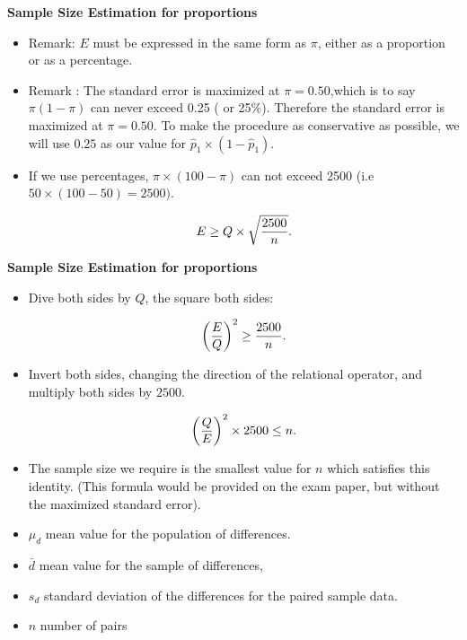 
\newpage






\textbf{Sample Size Estimation for proportions}
\begin{itemize}
\item Remark: $E$ must be expressed in the same form as $\pi$, either as a proportion or as a percentage.
\item Remark : The standard error is maximized at $\pi = 0.50$,which is to say $\pi(1-\pi)$ can never exceed 0.25 ( or 25\%). Therefore the standard error is maximized at $\pi = 0.50$. To make the procedure as conservative as possible, we will use $0.25$ as our value for $\hat{p}_1 \times (1 - \hat{p}_1)$.
\item If we use percentages, $\pi \times (100-\pi)$ can not exceed 2500 (i.e $ 50 \times (100-50)=2500)$.

\[ E \geq Q \times \sqrt{{2500 \over n}}. \]


\end{itemize}



\textbf{Sample Size Estimation for proportions}

\begin{itemize}

\item Dive both sides by $Q$, the square both sides:

\[ \left({E\over Q}\right)^2 \geq {2500 \over n}. \]

\item Invert both sides, changing the direction of the relational operator, and multiply both sides by $2500$.

\[ \left({Q\over E}\right)^2 \times 2500 \leq n. \]

\item The sample size we require is the smallest value for $n$ which satisfies this identity. (This formula would be provided on the exam paper, but without the maximized standard error).
\end{itemize}




{
\begin{itemize}
\item $\mu_d$ mean value for the population of differences.
\item $\bar{d}$ mean value for the sample of differences,
\item $s_d$ standard deviation of the differences for the paired sample data.
\item $n$ number of pairs
\end{itemize}


}




